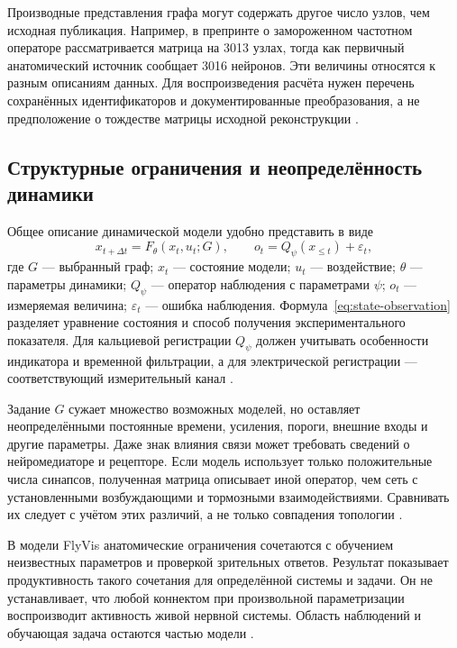 Производные представления графа могут содержать другое число узлов, чем исходная публикация. Например, в препринте о замороженном частотном операторе рассматривается матрица на 3013 узлах, тогда как первичный анатомический источник сообщает 3016 нейронов. Эти величины относятся к разным описаниям данных. Для воспроизведения расчёта нужен перечень сохранённых идентификаторов и документированные преобразования, а не предположение о тождестве матрицы исходной реконструкции \cite{s904,s854}.

\subsection{Структурные ограничения и неопределённость динамики}

Общее описание динамической модели удобно представить в виде
\begin{equation}
 x_{t+\Delta t}=F_{\theta}(x_t,u_t;G), \qquad
 o_t=Q_{\psi}(x_{\leq t})+\varepsilon_t,
 \label{eq:state-observation}
\end{equation}
где $G$ --- выбранный граф; $x_t$ --- состояние модели; $u_t$ --- воздействие; $\theta$ --- параметры динамики; $Q_{\psi}$ --- оператор наблюдения с параметрами $\psi$; $o_t$ --- измеряемая величина; $\varepsilon_t$ --- ошибка наблюдения. Формула~\eqref{eq:state-observation} разделяет уравнение состояния и способ получения экспериментального показателя. Для кальциевой регистрации $Q_{\psi}$ должен учитывать особенности индикатора и временной фильтрации, а для электрической регистрации --- соответствующий измерительный канал \cite{s212,s285}.

Задание $G$ сужает множество возможных моделей, но оставляет неопределёнными постоянные времени, усиления, пороги, внешние входы и другие параметры. Даже знак влияния связи может требовать сведений о нейромедиаторе и рецепторе. Если модель использует только положительные числа синапсов, полученная матрица описывает иной оператор, чем сеть с установленными возбуждающими и тормозными взаимодействиями. Сравнивать их следует с учётом этих различий, а не только совпадения топологии \cite{s743,s854}.

В модели FlyVis анатомические ограничения сочетаются с обучением неизвестных параметров и проверкой зрительных ответов. Результат показывает продуктивность такого сочетания для определённой системы и задачи. Он не устанавливает, что любой коннектом при произвольной параметризации воспроизводит активность живой нервной системы. Область наблюдений и обучающая задача остаются частью модели \cite{s744}.

